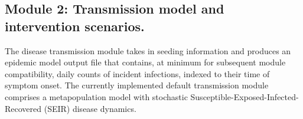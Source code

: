 \subsection{Module 2: Transmission model and intervention scenarios.}
The disease transmission module takes in seeding information and produces an epidemic model output file that contains, at minimum for subsequent module compatibility, daily counts of incident infections, indexed to their time of symptom onset. The currently implemented default transmission module comprises a metapopulation model with stochastic Susceptible-Exposed-Infected-Recovered (SEIR) disease dynamics.


